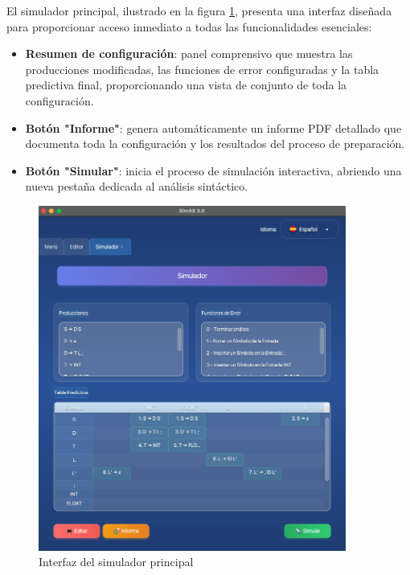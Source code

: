 El simulador principal, ilustrado en la figura \ref{fig:simulador_principal}, presenta una interfaz diseñada para proporcionar acceso inmediato a todas las funcionalidades esenciales:

\begin{itemize}
    \item \textbf{Resumen de configuración}: panel comprensivo que muestra las producciones modificadas, las funciones de error configuradas y la tabla predictiva final, proporcionando una vista de conjunto de toda la configuración.
    \item \textbf{Botón \string"Informe\string"}: genera automáticamente un informe PDF detallado que documenta toda la configuración y los resultados del proceso de preparación.
    \item \textbf{Botón \string"Simular\string"}: inicia el proceso de simulación interactiva, abriendo una nueva pestaña dedicada al análisis sintáctico.
\end{itemize}

\needspace{8cm}
\begin{figure}[H]
    \centering
    \includegraphics[width=0.9\textwidth]{figuras/simulador/simulador.png}
    \caption{Interfaz del simulador principal}
    \label{fig:simulador_principal}
\end{figure}

